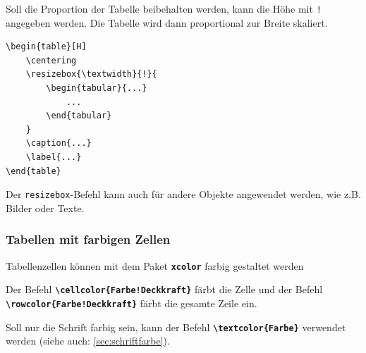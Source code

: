Soll die Proportion der Tabelle beibehalten werden, kann die Höhe mit \texttt{!} angegeben werden. Die Tabelle wird dann proportional zur Breite skaliert.

\begin{lstlisting}[language={[LaTeX]TeX}]
\begin{table}[H]
    \centering
    \resizebox{\textwidth}{!}{
        \begin{tabular}{...}
            ... 
        \end{tabular}
    }
    \caption{...}
    \label{...}
\end{table}
    \end{lstlisting}

Der \texttt{resizebox}-Befehl kann auch für andere Objekte angewendet werden, wie z.B. Bilder oder Texte.

\subsubsection{Tabellen mit farbigen Zellen}
Tabellenzellen können mit dem Paket \textbf{\texttt{xcolor}} farbig gestaltet werden

Der Befehl \textbf{\texttt{\textbackslash cellcolor\{Farbe!Deckkraft\}}} färbt die Zelle und der Befehl \textbf{\texttt{\textbackslash rowcolor\{Farbe!Deckkraft\}}} färbt die gesamte Zeile ein.

Soll nur die Schrift farbig sein, kann der Befehl \textbf{\texttt{\textbackslash textcolor\{Farbe\}}} verwendet werden (siehe auch: \ref{sec:schriftfarbe}).

